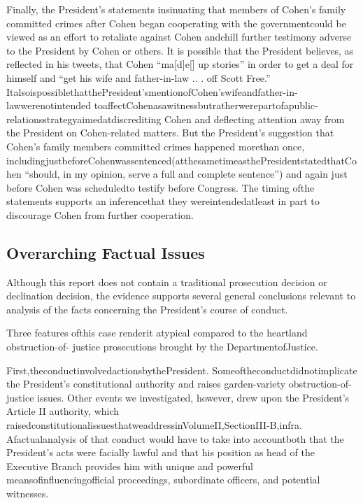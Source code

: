 {Finally, the President’s statements insinuating that members of Cohen’s family committed crimes after Cohen began cooperating with the governmentcould be viewed as an effort to retaliate against Cohen andchill further testimony adverse to the President by Cohen or others. It is possible that the President believes, as reflected in his tweets, that Cohen “ma[d]e[] up stories” in order to get a deal for himself and “get his wife and father-in-law .. . off Scott Free.” ItalsoispossiblethatthePresident’smentionofCohen’swifeandfather-in-lawwerenotintended toaffectCohenasawitnessbutratherwerepartofapublic-relationsstrategyaimedatdiscrediting Cohen and deflecting attention away from the President on Cohen-related matters. But the President’s suggestion that Cohen’s family members committed crimes happened morethan once, includingjustbeforeCohenwassentenced(atthesametimeasthePresidentstatedthatCohen “should, in my opinion, serve a full and complete sentence”) and again just before Cohen was scheduledto testify before Congress. The timing ofthe statements supports an inferencethat they wereintendedatleast in part to discourage Cohen from further cooperation.

\subsection{Overarching Factual Issues}

Although this report does not contain a traditional prosecution decision or declination decision, the evidence supports several general conclusions relevant to analysis of the facts concerning the President’s course of conduct.

Three features ofthis case renderit atypical compared to the heartland obstruction-of- justice prosecutions brought by the DepartmentofJustice.

First,theconductinvolvedactionsbythePresident. Someoftheconductdidnotimplicate the President’s constitutional authority and raises garden-variety obstruction-of-justice issues. Other events we investigated, however, drew upon the President’s Article II authority, which raisedconstitutionalissuesthatweaddressinVolumeII,SectionIII-B,infra. Afactualanalysis of that conduct would have to take into accountboth that the President’s acts were facially lawful and that his position as head of the Executive Branch provides him with unique and powerful meansofinfluencingofficial proceedings, subordinate officers, and potential witnesses.

}
